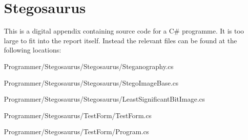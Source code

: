 \chapter{Stegosaurus}
\label{app:A}
This is a digital appendix containing source code for a C\# programme. It is too large to fit into the report itself.
Instead the relevant files can be found at the following locations:

Programmer/Stegosaurus/Stegosaurus/Steganography.cs

Programmer/Stegosaurus/Stegosaurus/StegoImageBase.cs

Programmer/Stegosaurus/Stegosaurus/LeastSignificantBitImage.cs

Programmer/Stegosaurus/TestForm/TestForm.cs

Programmer/Stegosaurus/TestForm/Program.cs

%
%
%
%
%
